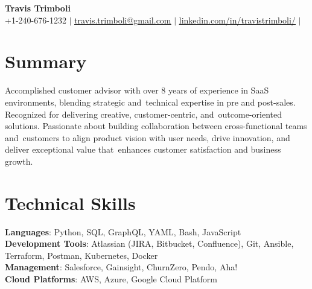 \documentclass[letterpaper,11pt]{article}
\begin{document}

\begin{center}
  \textbf{\Huge \bfseries Travis Trimboli} \\ \vspace{5pt}
  \small +1-240-676-1232 $|$ \href{mailto:travis.trimboli@gmail.com}{\underline{travis.trimboli@gmail.com}} $|$
  \href{https://www.linkedin.com/in/travistrimboli/}{\underline{linkedin.com/in/travistrimboli/}} $|$
\end{center}

\section*{Summary}
Accomplished customer advisor with over 8 years of experience in SaaS environments, blending strategic and\
technical expertise in pre and post-sales. Recognized for delivering creative, customer-centric, and\
outcome-oriented solutions. Passionate about building collaboration between cross-functional teams and\
customers to align product vision with user needs, drive innovation, and deliver exceptional value that\
enhances customer satisfaction and business growth.

\section{Technical Skills}
\begin{itemize}[leftmargin=0.15in, label={}]
  \small{\item{
        \textbf{Languages}{: Python, SQL, GraphQL, YAML, Bash, JavaScript} \\ \vspace{1pt}
        \textbf{Development Tools}{: Atlassian (JIRA, Bitbucket, Confluence), Git, Ansible, Terraform, Postman, Kubernetes, Docker} \\ \vspace{1pt}
        \textbf{Management}{: Salesforce, Gainsight, ChurnZero, Pendo, Aha!} \\ \vspace{1pt}
        \textbf{Cloud Platforms}{: AWS, Azure, Google Cloud Platform}
        }}
\end{itemize}
\end{document}

